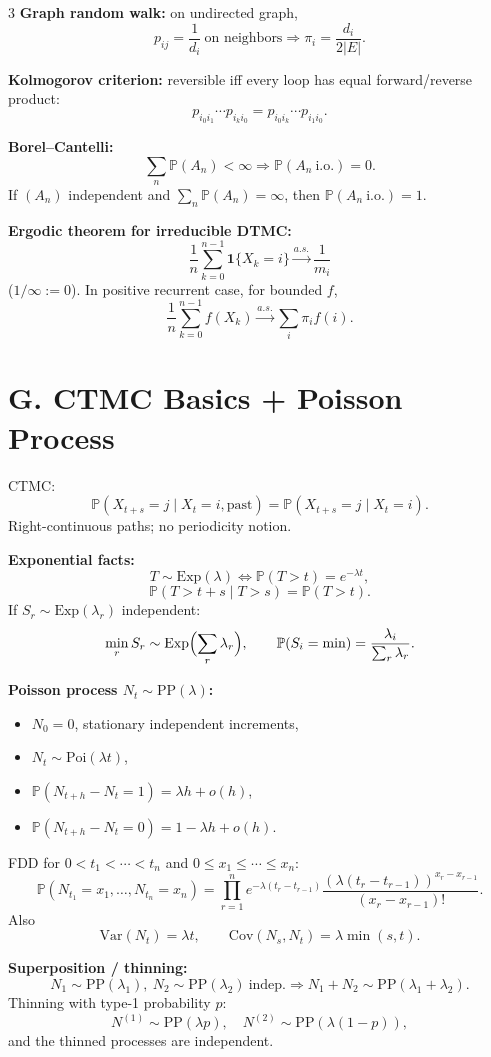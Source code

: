 \documentclass[8pt]{extarticle}
\newcommand{\PP}{\mathbb{P}}
\newcommand{\Var}{\mathrm{Var}}
\newcommand{\1}{\mathbf{1}}
\begin{document}
\begin{multicols*}{3}
\textbf{Graph random walk:} on undirected graph,
\[
p_{ij}=\frac{1}{d_i}\ \text{on neighbors}\Rightarrow
\pi_i=\frac{d_i}{2|E|}.
\]

\textbf{Kolmogorov criterion:} reversible iff every loop has equal forward/reverse product:
\[
p_{i_0i_1}\cdots p_{i_ki_0}=p_{i_0i_k}\cdots p_{i_1i_0}.
\]

\textbf{Borel--Cantelli:}
\[
\sum_n \PP(A_n)<\infty \Rightarrow \PP(A_n\ \text{i.o.})=0.
\]
If $(A_n)$ independent and $\sum_n\PP(A_n)=\infty$, then $\PP(A_n\ \text{i.o.})=1$.

\textbf{Ergodic theorem for irreducible DTMC:}
\[
\frac{1}{n}\sum_{k=0}^{n-1}\1\{X_k=i\}\xrightarrow{a.s.}\frac{1}{m_i}
\]
($1/\infty:=0$). In positive recurrent case, for bounded $f$,
\[
\frac1n\sum_{k=0}^{n-1}f(X_k)\xrightarrow{a.s.}\sum_i \pi_i f(i).
\]

\section*{G. CTMC Basics + Poisson Process}
CTMC:
\[
\PP(X_{t+s}=j\mid X_t=i,\text{past})=\PP(X_{t+s}=j\mid X_t=i).
\]
Right-continuous paths; no periodicity notion.

\textbf{Exponential facts:}
\[
T\sim\mathrm{Exp}(\lambda)\iff \PP(T>t)=e^{-\lambda t},
\]
\[
\PP(T>t+s\mid T>s)=\PP(T>t).
\]
If $S_r\sim \mathrm{Exp}(\lambda_r)$ independent:
\[
\min_r S_r\sim \mathrm{Exp}\Bigl(\sum_r\lambda_r\Bigr),\qquad
\PP(S_i=\min)=\frac{\lambda_i}{\sum_r\lambda_r}.
\]

\textbf{Poisson process $N_t\sim \mathrm{PP}(\lambda)$:}
\begin{itemize}
\item $N_0=0$, stationary independent increments,
\item $N_t\sim \mathrm{Poi}(\lambda t)$,
\item $\PP(N_{t+h}-N_t=1)=\lambda h+o(h)$,
\item $\PP(N_{t+h}-N_t=0)=1-\lambda h+o(h)$.
\end{itemize}
FDD for $0<t_1<\cdots<t_n$ and $0\le x_1\le\cdots\le x_n$:
\[
\PP(N_{t_1}=x_1,\dots,N_{t_n}=x_n)
=\prod_{r=1}^n e^{-\lambda(t_r-t_{r-1})}
\frac{(\lambda(t_r-t_{r-1}))^{x_r-x_{r-1}}}{(x_r-x_{r-1})!}.
\]
Also
\[
\Var(N_t)=\lambda t,\qquad \mathrm{Cov}(N_s,N_t)=\lambda\min(s,t).
\]

\textbf{Superposition / thinning:}
\[
N_1\sim \mathrm{PP}(\lambda_1),\ N_2\sim \mathrm{PP}(\lambda_2)\ \text{indep.}
\Rightarrow N_1+N_2\sim \mathrm{PP}(\lambda_1+\lambda_2).
\]
Thinning with type-1 probability $p$:
\[
N^{(1)}\sim \mathrm{PP}(\lambda p),\quad N^{(2)}\sim \mathrm{PP}(\lambda(1-p)),
\]
and the thinned processes are independent.


\end{multicols*}
\end{document}
